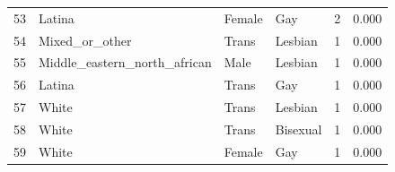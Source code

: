 \begin{table}[htbp]
\begin{tabular}{llllll}
53 & Latina & Female & Gay & 2 & 0.000 \\
54 & Mixed\_or\_other & Trans & Lesbian & 1 & 0.000 \\
55 & Middle\_eastern\_north\_african & Male & Lesbian & 1 & 0.000 \\
56 & Latina & Trans & Gay & 1 & 0.000 \\
57 & White & Trans & Lesbian & 1 & 0.000 \\
58 & White & Trans & Bisexual & 1 & 0.000 \\
59 & White & Female & Gay & 1 & 0.000 \\
\bottomrule
\end{tabular}

\end{table}
